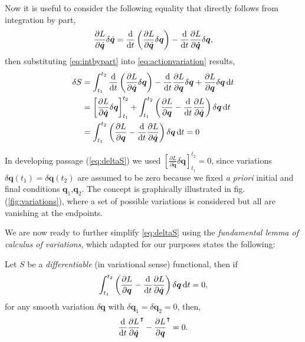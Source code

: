 		Now it is useful to consider the following equality that directly follows from integration by part,
		\begin{equation}
			\label{eq:intbypart}
			\frac{\partial L}{\partial\dot{\bm{q}}}\delta\dot{\bm{q}} = \frac{\mathop{}\!\mathrm{d}}{\mathop{}\!\mathrm{d} t}\left(\frac{\partial L}{\partial\dot{\bm{q}}}\delta \bm{q}\right)-\frac{\mathop{}\!\mathrm{d}}{\mathop{}\!\mathrm{d} t}\frac{\partial L}{\partial \bm{\dot{q}}}\delta \bm{q},
		\end{equation}
		then substituting \cref{eq:intbypart} into \cref{eq:actionvariation} results,
		\begin{subequations}
			\begin{align}
				\delta S 
				&= \int_{t_{1}}^{t_{2}}\frac{\diff}{\diff t}\left(\frac{\partial L}{\partial\dot{\bm{q}}}\delta \bm{q}\right)-\frac{\diff}{\diff t}\frac{\partial L}{\partial \bm{q}}\delta \bm{q} + \frac{\partial L}{\partial \bm{q}}\delta \bm{q}\diff t \\
				\label{eq:deltaS}
				&= \left[\frac{\partial L}{\partial\dot{\bm{q}}}\delta \bm{q}\right]_{t_{1}}^{t_{2}}+\int_{t_{1}}^{t_{2}}\left(\frac{\partial L}{\partial \bm{q}}-\frac{\diff}{\diff t}\frac{\partial L}{\partial\dot{\bm{q}}}\right)\delta \bm{q}\diff t \\
				&= \int_{t_{1}}^{t_{2}}\left(\frac{\partial L}{\partial \bm{q}}-\frac{\diff}{\diff t}\frac{\partial L}{\partial\dot{\bm{q}}}\right)\delta \bm{q}\diff t = 0
			\end{align}
		\end{subequations}
		\begin{remark}
			In developing passage (\ref{eq:deltaS}) we used $\left[\frac{\partial L}{\partial\dot{\bm{q}}}\delta \bm{q}\right]_{t_{1}}^{t_{2}} = 0$, since variations $\delta\bm{q}(t_{1}) = \delta\bm{q}(t_{2})$ are assumed to be zero because we fixed \emph{a priori} initial and final conditions $\bm{q}_{1}$,$\bm{q}_{2}$. The concept is graphically illustrated in fig. (\ref{fig:variations}), where a set of possible variations is considered but all are vanishing at the endpoints.
		\end{remark}
		
		We are now ready to further simplify \cref{eq:deltaS} using the \emph{fundamental lemma of calculus of variations}, which adapted for our purposes states the following:
		\begin{lemma}
			\label{lem:foundamentallemma}
			Let $S$ be a \emph{differentiable} (in variational sense) functional, then if
			\begin{equation}
				\int_{t_{1}}^{t_{2}}\left(\frac{\partial L}{\partial \bm{q}}-\frac{\mathop{}\!\mathrm{d}}{\mathop{}\!\mathrm{d} t}\frac{\partial L}{\partial\dot{\bm{q}}}\right)\delta \bm{q}\mathop{}\!\mathrm{d} t = 0,
			\end{equation}
			for any smooth variation $\delta\bm{q}$ with $\delta\bm{q}_{1}=\delta\bm{q}_{2}=0$, then, 
			\begin{equation}
				\label{eq:euleroequations}
				\frac{\mathop{}\!\mathrm{d}}{\mathop{}\!\mathrm{d} t}\frac{\partial L}{\partial\dot{\bm{q}}}^{\intercal}-\frac{\partial L}{\partial \bm{q}}^{\intercal} = 0.
			\end{equation}
		\end{lemma}	
